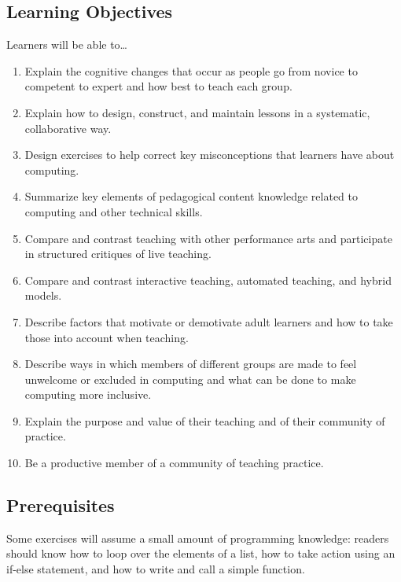 \subsection*{Learning Objectives}

Learners will be able to\ldots{}

\begin{enumerate}
\item
  Explain the cognitive changes that occur as people go from novice to
  competent to expert and how best to teach each group.
\item
  Explain how to design, construct, and maintain lessons in a
  systematic, collaborative way.
\item
  Design exercises to help correct key misconceptions that learners
  have about computing.
\item
  Summarize key elements of pedagogical content knowledge related to
  computing and other technical skills.
\item
  Compare and contrast teaching with other performance arts and
  participate in structured critiques of live teaching.
\item
  Compare and contrast interactive teaching, automated teaching, and
  hybrid models.
\item
  Describe factors that motivate or demotivate adult learners and how
  to take those into account when teaching.
\item
  Describe ways in which members of different groups are made to feel
  unwelcome or excluded in computing and what can be done to make
  computing more inclusive.
\item
  Explain the purpose and value of their teaching and of their
  community of practice.
\item
  Be a productive member of a community of teaching practice.
\end{enumerate}

\subsection*{Prerequisites}

Some exercises will assume a small amount of programming knowledge:
readers should know how to loop over the elements of a list, how to take
action using an if-else statement, and how to write and call a simple
function.
